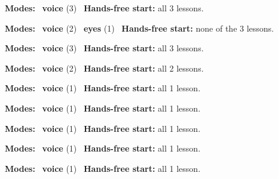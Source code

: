 \expandafter\def\csname hlchaptermodality15\endcsname{%
  {\small\noindent
    \textbf{Modes:} \hlvoicesign{}~\textbf{voice} (3)\quad
    \hlvoicesign{}~\textbf{Hands-free start:} all 3 lessons.%
    \par}\medskip
}

\expandafter\def\csname hlchaptermodality16\endcsname{%
  {\small\noindent
    \textbf{Modes:} \hlvoicesign{}~\textbf{voice} (2) \quad \hlsightsign{}~\textbf{eyes} (1)\quad
    \hlvoicesign{}~\textbf{Hands-free start:} none of the 3 lessons.%
    \par}\medskip
}

\expandafter\def\csname hlchaptermodality17\endcsname{%
  {\small\noindent
    \textbf{Modes:} \hlvoicesign{}~\textbf{voice} (3)\quad
    \hlvoicesign{}~\textbf{Hands-free start:} all 3 lessons.%
    \par}\medskip
}

\expandafter\def\csname hlchaptermodality18\endcsname{%
  {\small\noindent
    \textbf{Modes:} \hlvoicesign{}~\textbf{voice} (2)\quad
    \hlvoicesign{}~\textbf{Hands-free start:} all 2 lessons.%
    \par}\medskip
}

\expandafter\def\csname hlchaptermodality19\endcsname{%
  {\small\noindent
    \textbf{Modes:} \hlvoicesign{}~\textbf{voice} (1)\quad
    \hlvoicesign{}~\textbf{Hands-free start:} all 1 lesson.%
    \par}\medskip
}

\expandafter\def\csname hlchaptermodality20\endcsname{%
  {\small\noindent
    \textbf{Modes:} \hlvoicesign{}~\textbf{voice} (1)\quad
    \hlvoicesign{}~\textbf{Hands-free start:} all 1 lesson.%
    \par}\medskip
}

\expandafter\def\csname hlchaptermodality21\endcsname{%
  {\small\noindent
    \textbf{Modes:} \hlvoicesign{}~\textbf{voice} (1)\quad
    \hlvoicesign{}~\textbf{Hands-free start:} all 1 lesson.%
    \par}\medskip
}

\expandafter\def\csname hlchaptermodality22\endcsname{%
  {\small\noindent
    \textbf{Modes:} \hlvoicesign{}~\textbf{voice} (1)\quad
    \hlvoicesign{}~\textbf{Hands-free start:} all 1 lesson.%
    \par}\medskip
}

\expandafter\def\csname hlchaptermodality23\endcsname{%
  {\small\noindent
    \textbf{Modes:} \hlvoicesign{}~\textbf{voice} (1)\quad
    \hlvoicesign{}~\textbf{Hands-free start:} all 1 lesson.%
    \par}\medskip
}

